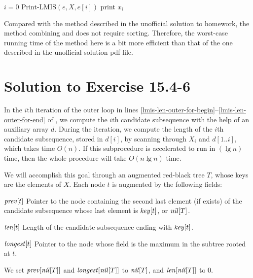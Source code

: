 \documentclass[a4paper, fleqn]{article}
\begin{document}
\begin{codebox}
\li \If $i = 0$
\li   \Then
        \Return
\li   \Else
        Print-LMIS$(e, X, e[i])$
\li     print $x_i$
      \End
\end{codebox}

Compared with the method described in the unofficial solution to
homework, the method combining  and
 does not require sorting. Therefore, the worst-case
running time of the method here is a bit more efficient than that of
the one described in the unofficial-solution pdf file.






\section*{Solution to Exercise 15.4-6}

In the $i$th iteration of the outer  loop in lines
\ref{lmis-len-outer-for-begin}--\ref{lmis-len-outer-for-end} of
, we compute the $i$th candidate subsequence with
the help of an auxiliary array $d$. During the iteration, we compute
the length of the $i$th candidate subsequence, stored in $d[i]$, by
scanning through $X_i$ and $d[1..i]$, which takes time $O(n)$. If this
subprocedure is accelerated to run in $(\lg n)$ time, then the whole
procedure will take $O(n \lg n)$ time.

We will accomplish this goal through an augmented red-black tree $T$,
whose keys are the elements of $X$. Each node $t$ is augmented by the
following fields:

\begin{description}
\item{$\id{prev}[t]$}
Pointer to the node containing the second last element (if exists) of
the candidate subsequence whose last element is $\id{key}[t]$, or
$\id{nil}[T]$.

\item{$\id{len}[t]$}
Length of the candidate subsequence ending with $\id{key}[t]$.

\item{$\id{longest}[t]$}
Pointer to the node whose  field is the maximum in the subtree
rooted at $t$.
\end{description}

We set $\id{prev}[\id{nil}[T]]$ and $\id{longest}[\id{nil}[T]]$ to
$\id{nil}[T]$, and $\id{len}[\id{nil}[T]]$ to 0.
\end{document}
